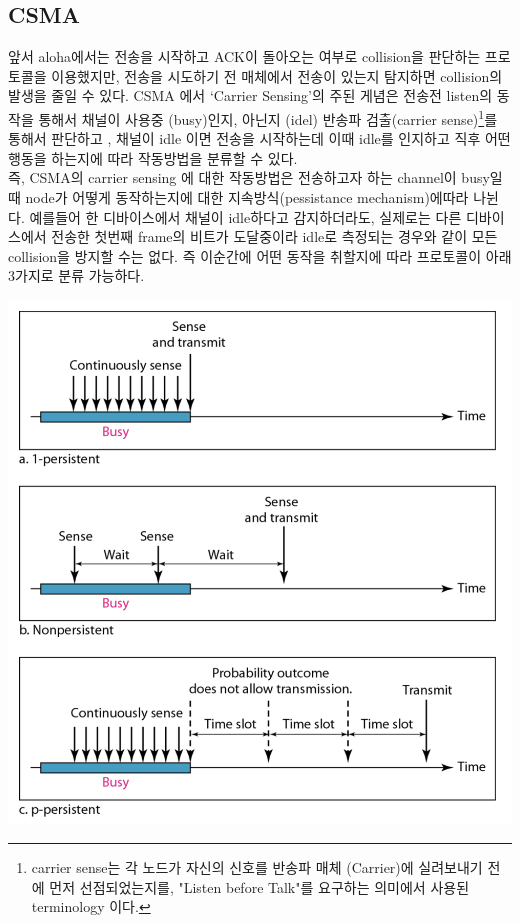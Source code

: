 \begin{multicols}{2}
\section{CSMA}
앞서 aloha에서는 전송을 시작하고 ACK이 돌아오는 여부로 collision을 판단하는 프로토콜을 이용했지만, 전송을 시도하기 전 매체에서 전송이 있는지 탐지하면 collision의 발생을 줄일 수 있다. CSMA 에서 ‘Carrier Sensing’의 주된 게념은   전송전 listen의 동작을 통해서 채널이 사용중 (busy)인지, 아닌지 (idel) 반송파 검출(carrier sense)\footnote{carrier sense는 각 노드가 자신의 신호를 반송파 매체 (Carrier)에 실려보내기 전에 먼저 선점되었는지를, "Listen before Talk"를 요구하는 의미에서 사용된 terminology 이다.}를 통해서 판단하고 , 채널이 idle 이면 전송을 시작하는데 이때 idle를 인지하고 직후 어떤 행동을 하는지에 따라 작동방법을 분류할 수 있다.\\

즉, CSMA의 carrier sensing 에 대한 작동방법은 전송하고자 하는 channel이 busy일때 node가 어떻게 동작하는지에 대한 지속방식(pessistance mechanism)에따라 나뉜다.  예를들어 한 디바이스에서 채널이 idle하다고 감지하더라도, 실제로는 다른 디바이스에서 전송한 첫번째 frame의 비트가 도달중이라 idle로 측정되는 경우와 같이 모든 collision을 방지할 수는 없다. 즉 이순간에 어떤 동작을 취할지에 따라 프로토콜이 아래 3가지로 분류 가능하다.\\
    \begin{minipage}{\columnwidth}
    \vspace{2mm}
    \centering%
    \includegraphics[width=.9\textwidth]{image/week12/2-1.png}
    \vspace{-3mm}
    \vspace{-4mm}
    \end{minipage}
\vspace{-2mm}
\vspace{-2mm}

\end{multicols}

